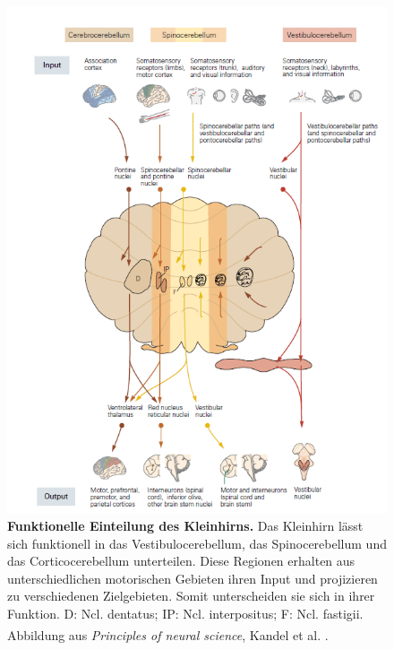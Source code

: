 \begin{figure}[H]
    \centering
    \includegraphics[width=\textwidth]{pictures/Bilder_Laura/funktionelle_einteilung_kleinhirn.PNG}
    \caption[Funktionelle Einteilung des Kleinhirns]{\textbf{Funktionelle Einteilung des Kleinhirns.} Das Kleinhirn lässt sich funktionell in das Vestibulocerebellum, das Spinocerebellum und das Corticocerebellum unterteilen. Diese Regionen erhalten aus unterschiedlichen motorischen Gebieten ihren Input und projizieren zu verschiedenen Zielgebieten. Somit unterscheiden sie sich in ihrer Funktion. D: Ncl. dentatus; IP: Ncl. interpositus; F: Ncl. fastigii. \\ Abbildung aus \textit{Principles of neural science}, Kandel et al. \textsuperscript{\cite[Kap.~42]{kandel2013principles}}.}
    \label{fig:funktion_kleinhirn}
\end{figure}

